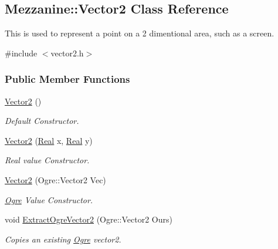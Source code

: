\hypertarget{classMezzanine_1_1Vector2}{
\subsection{Mezzanine::Vector2 Class Reference}
\label{classMezzanine_1_1Vector2}
}


This is used to represent a point on a 2 dimentional area, such as a screen.  




{\ttfamily \#include $<$vector2.h$>$}

\subsubsection*{Public Member Functions}
\begin{DoxyCompactItemize}
\item 
\hyperlink{classMezzanine_1_1Vector2_a28774bd4b7bcbb09bfd20cf7c30213a2}{Vector2} ()
\begin{DoxyCompactList}\small\item\em Default Constructor. \item\end{DoxyCompactList}\item 
\hyperlink{classMezzanine_1_1Vector2_a3abcc1fd9f74456cd8f8441d790d03ce}{Vector2} (\hyperlink{namespaceMezzanine_a726731b1a7df72bf3583e4a97282c6f6}{Real} x, \hyperlink{namespaceMezzanine_a726731b1a7df72bf3583e4a97282c6f6}{Real} y)
\begin{DoxyCompactList}\small\item\em Real value Constructor. \item\end{DoxyCompactList}\item 
\hyperlink{classMezzanine_1_1Vector2_afef55035d60801454d4b207cf3c2aeaf}{Vector2} (Ogre::Vector2 Vec)
\begin{DoxyCompactList}\small\item\em \hyperlink{namespaceOgre}{Ogre} Value Constructor. \item\end{DoxyCompactList}\item 
void \hyperlink{classMezzanine_1_1Vector2_a122b3ce34c1afea300ddcae158fca294}{ExtractOgreVector2} (Ogre::Vector2 Ours)
\begin{DoxyCompactList}\small\item\em Copies an existing \hyperlink{namespaceOgre}{Ogre} vector2. \item\end{DoxyCompactList}\item 

\end{DoxyCompactItemize}
